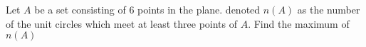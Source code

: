 Let $A$ be a set consisting of 6 points in the plane. denoted $n(A)$ as the number of the unit circles  which meet  at  least three points of $A$. Find the maximum of $n(A)$
